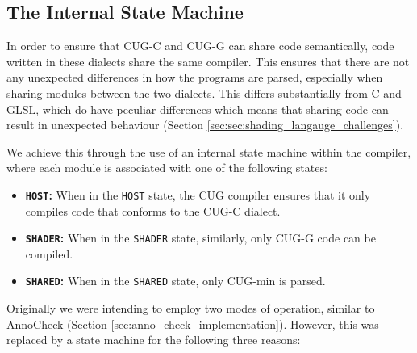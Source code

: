 \documentclass[a4paper,12pt,twoside,openright]{report}
\begin{document}
\subsection{The Internal State Machine}

\label{sec:internal_state_machine}

In order to ensure that CUG-C and CUG-G can share code semantically, code
written in these dialects share the same compiler. This ensures that there are
not any unexpected differences in how the programs are parsed, especially when
sharing modules between the two dialects. This differs substantially from C and
GLSL, which do have peculiar differences which means that sharing code can
result in unexpected behaviour (Section
\ref{sec:sec:shading_langauge_challenges}).

We achieve this through the use of an internal state machine within the
compiler, where each module is associated with one of the following states:

\begin{itemize}

    \item \textbf{\texttt{HOST}:} When in the \texttt{HOST} state, the CUG
    compiler ensures that it only compiles code that conforms to the CUG-C
    dialect.

    \item \textbf{\texttt{SHADER}:} When in the \texttt{SHADER} state,
    similarly, only CUG-G code can be compiled.

    \item \textbf{\texttt{SHARED}:} When in the \texttt{SHARED} state, only
    CUG-min is parsed.

\end{itemize}

Originally we were intending to employ two modes of operation, similar to
AnnoCheck (Section \ref{sec:anno_check_implementation}). However, this was
replaced by a state machine for the following three reasons:
\end{document}

